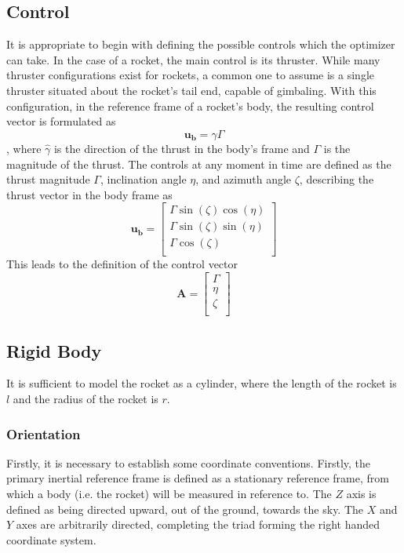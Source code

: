 \documentclass{article}
\begin{document}
\subsection{Control}
It is appropriate to begin with defining the possible controls which the optimizer can take. In the case of a rocket, the main control is its thruster. While many thruster configurations exist for rockets, a common one to assume is a single thruster situated about the rocket's tail end, capable of gimbaling. With this configuration, in the reference frame of a rocket's body, the resulting control vector is formulated as $$ \mathbf{u_b} = \hat{\gamma}\Gamma $$, where $\hat{\gamma}$ is the direction of the thrust in the body's frame and $\Gamma$ is the magnitude of the thrust. The controls at any moment in time are defined as the thrust magnitude $\Gamma$, inclination angle $\eta$, and azimuth angle $\zeta$, describing the thrust vector in the body frame as $$ \mathbf{u_b} = \left[
\begin{array}{c}
 \Gamma  \sin (\zeta ) \cos (\eta ) \\
 \Gamma  \sin (\zeta ) \sin (\eta ) \\
 \Gamma  \cos (\zeta ) \\
\end{array}
\right] $$
This leads to the definition of the control vector
$$
\mathbf{A} = \left[
\begin{array}{c}
\Gamma \\
\eta \\
\zeta \\
\end{array}
\right]
$$

\subsection{Rigid Body}
It is sufficient to model the rocket as a cylinder, where the length of the rocket is $l$ and the radius of the rocket is $r$. 
\subsubsection{Orientation}
Firstly, it is necessary to establish some coordinate conventions. Firstly, the primary inertial reference frame is defined as a stationary reference frame, from which a body (i.e. the rocket) will be measured in reference to. The $Z$ axis is defined as being directed upward, out of the ground, towards the sky. The $X$ and $Y$ axes are arbitrarily directed, completing the triad forming the right handed coordinate system. 
\end{document}
